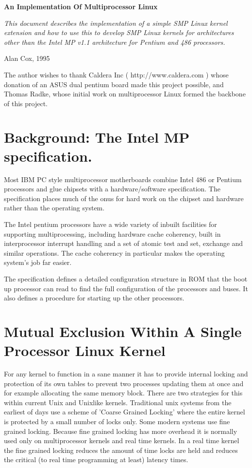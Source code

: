 \documentclass[]{article}
\begin{document}
\begin{center}
\LARGE \bf
An Implementation Of Multiprocessor Linux
\normalsize
\end{center}

{ \it
This document describes the implementation of a simple SMP 
Linux kernel extension and how to use this to develop SMP Linux kernels for 
architectures other than the Intel MP v1.1 architecture for Pentium and 486 
processors.}

\hfill Alan Cox, 1995


The author wishes to thank Caldera Inc ( http://www.caldera.com )
whose donation of an ASUS dual pentium board made this project possible, 
and Thomas Radke, whose initial work on multiprocessor Linux formed 
the backbone of this project.

\section{Background: The Intel MP specification.}
Most IBM PC style multiprocessor motherboards combine Intel 486 or Pentium 
processors and glue chipsets with a hardware/software specification. The 
specification places much of the onus for hard work on the chipset and 
hardware rather than the operating system.

The Intel pentium processors have a wide variety of inbuilt facilities for 
supporting multiprocessing, including hardware cache coherency, built in 
interprocessor interrupt handling and a set of atomic test and set, 
exchange and similar operations. The cache coherency in particular makes the 
operating system's job far easier.

The specification defines a detailed configuration structure in ROM that 
the boot up processor can read to find the full configuration of the 
processors and buses. It also defines a procedure for starting up the 
other processors.


\section{Mutual Exclusion Within A Single Processor Linux Kernel}
For any kernel to function in a sane manner it has to provide internal 
locking and protection of its own tables to prevent two processes updating 
them at once and for example allocating the same memory block. There are 
two strategies for this within current Unix and Unixlike kernels. 
Traditional unix systems from the earliest of days use a scheme of 'Coarse 
Grained Locking' where the entire kernel is protected by a small number of 
locks only. Some modern systems use fine grained locking. Because fine 
grained locking has more overhead it is normally used only on 
multiprocessor kernels and real time kernels. In a real time kernel the 
fine grained locking reduces the amount of time locks are held and reduces 
the critical (to real time programming at least) latency times.
\end{document}
